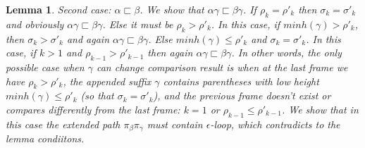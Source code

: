 \documentclass[AMA,STIX1COL]{WileyNJD-v2}
\newtheorem{XLem}{Lemma}
\begin{document}
\begin{XLem}
    Second case: $\alpha \sqsubset \beta$.
    We show that $\alpha \gamma \sqsubset \beta \gamma$.
    If $\rho_k = \rho'_k$ then $\sigma_k = \sigma'_k$
    and obviously $\alpha \gamma \sqsubset \beta \gamma$.
    Else it must be $\rho_k > \rho'_k$.
    In this case, if $minh (\gamma) > \rho'_k$, then $\sigma_k > \sigma'_k$ and again $\alpha \gamma \sqsubset \beta \gamma$.
    Else $minh (\gamma) \leq \rho'_k$ and $\sigma_k = \sigma'_k$.
    In this case, if $k > 1$ and $\rho_{k-1} > \rho'_{k-1}$ then again $\alpha \gamma \sqsubset \beta \gamma$.
    In other words, the only possible case when $\gamma$ can change comparison result is
    when at the last frame we have $\rho_k > \rho'_k$,
    the appended suffix $\gamma$ contains parentheses with low height $minh (\gamma) \leq \rho'_k$
    (so that $\sigma_k = \sigma'_k$),
    and the previous frame doesn't exist
    or compares differently from the last frame: $k = 1$ or $\rho_{k-1} \leq \rho'_{k-1}$.
    We show that in this case the extended path $\pi_\beta \pi_\gamma$ must contain $\epsilon$-loop,
    which contradicts to the lemma condiitons.


\end{XLem}
\end{document}
